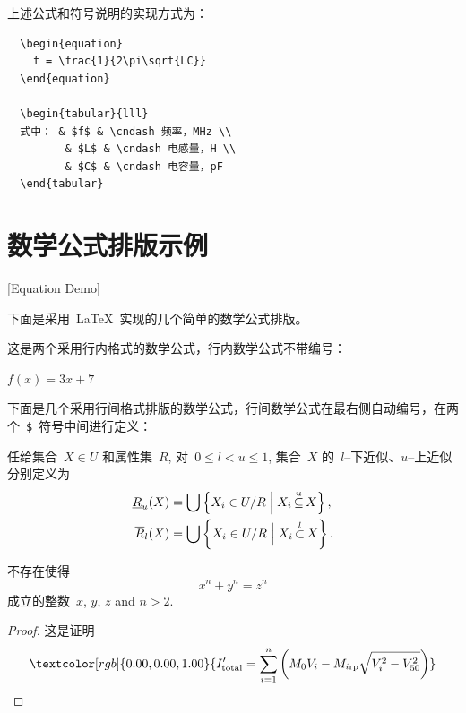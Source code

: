 上述公式和符号说明的实现方式为：

\begin{lstlisting}
  \begin{equation}
    f = \frac{1}{2\pi\sqrt{LC}}
  \end{equation}

  \begin{tabular}{lll}
  式中： & $f$ & \cndash 频率，MHz \\
         & $L$ & \cndash 电感量，H \\
         & $C$ & \cndash 电容量，pF 
  \end{tabular}
\end{lstlisting}

\section{数学公式排版示例}[Equation Demo]

下面是采用~\LaTeX~实现的几个简单的数学公式排版。

这是两个采用行内格式的数学公式，行内数学公式不带编号：

$f(x) = 3x + 7$

下面是几个采用行间格式排版的数学公式，行间数学公式在最右侧自动编号，在两个~\verb|$|~符号中间进行定义：

\begin{definition}
  任给集合~$X \in U$ 和属性集~$R$, 对~$0\leqslant l < u \leqslant 1$,
  集合~$X$ 的~$l${--}下近似、$u${--}上近似分别定义为
  \begin{align}
    \underline {R} _u (X) & =  \bigcup \left\{ {X_i  \in U/R\Bigm|X_i \mathop  \subseteq \limits^u  X} \right\}, \\
    \overline {R} _l (X)  & =  \bigcup \left\{ {X_i  \in U/R\Bigm|X_i \mathop  \subset \limits^l X} \right\}.
  \end{align}
\end{definition}

\begin{theorem}[\heiti 费马]
  {\upshape\kaishu 不存在使得~
    \begin{equation}
      x^n+y^n=z^n
    \end{equation}
    成立的整数~$x$, $y$, $z$ and $n>2$. }
\end{theorem}

\begin{proof}
  {\upshape\kaishu 这是证明
    \begin{equation}
      \textcolor[rgb]{0.00,0.00,1.00}{
      I'_{{\rm{total}}} = \sum\limits_{i = 1}^n
      {\left( {M_0 V_i - M_{i{\rm{rp}}} \sqrt{V_i^2 - V_{50}^2}}\right)}}
    \end{equation}}
\end{proof}

